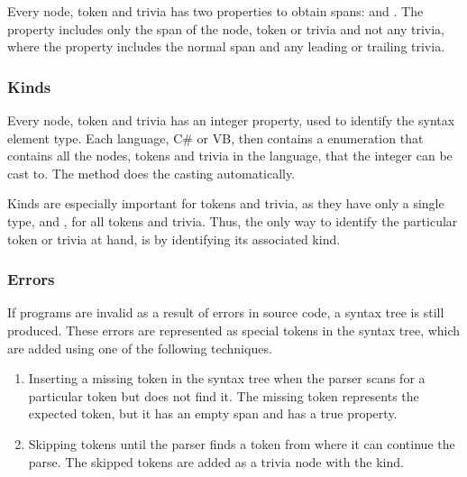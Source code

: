 Every node, token and trivia has two properties to obtain spans:  and . The  property includes only the span of the node, token or trivia and not any trivia, where the  property includes the normal span and any leading or trailing trivia.  

\subsubsection{Kinds}
Every node, token and trivia has an integer  property, used to identify the syntax element type. Each language, C\# or \ac{VB}, then contains a  enumeration that contains all the nodes, tokens and trivia in the language, that the integer can be cast to. The  method does the casting automatically\cite{roslynwikiOverview}\cite[p. 9]{ng2012roslyn}.

Kinds are especially important for tokens and trivia, as they have only a single type,  and , for all tokens and trivia. Thus, the only way to identify the particular token or trivia at hand, is by identifying its associated kind.

\subsubsection{Errors}
If programs are invalid as a result of errors in source code, a syntax tree is still produced. These errors are represented as special tokens in the syntax tree, which are added using one of the following techniques\cite[p. 9]{ng2012roslyn}.
\begin{enumerate}
\item Inserting a missing token in the syntax tree when the parser scans for a particular token but does not find it. The missing token represents the expected token, but it has an empty span and has a true  property.
\item Skipping tokens until the parser finds a token from where it can continue the parse. The skipped tokens are added as a trivia node with the  kind.
\end{enumerate}


	

